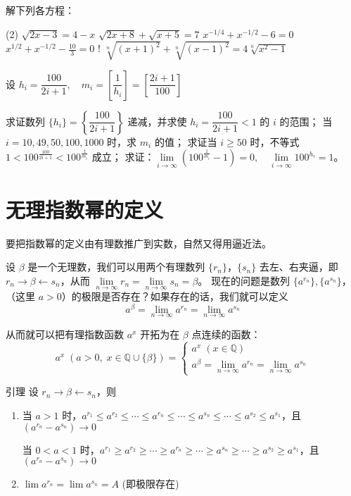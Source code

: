 \begin{Exercise}
\begin{question}
\begin{tasks}
  \end{tasks}
  \item  解下列各方程：
  \begin{tasks}(2)
    \task  $\sqrt{2 x-3}=4-x$
    \task  $\sqrt{2 x+8}+\sqrt{x+5}=7$
    \task  $x^{-1 / 4}+x^{-1 / 2}-6=0$
    \task  $x^{1 / 2}+x^{-1 / 2}-\frac{10}{3}=0$
    \task!  $\sqrt[n]{(x+1)^{2}}+\sqrt[n]{(x-1)^{2}}=4 \sqrt[n]{x^{2}-1}$
  \end{tasks}
  \item  设 $h_{i}=\dfrac{100}{2i+1},\quad  m_{i}=\left[\dfrac{1}{h_{i}}\right]=\left[\dfrac{2 i+1}{100}\right]$
  \begin{tasks}
    \task 求证数列 $\{h_i\}=\left\{\dfrac{100}{2i+1}\right\}$ 递减，并求使 $h_i=\dfrac{100}{2i+1}<1$ 的 $i$ 的范围；
    \task 当 $i=10,49,50,100,1000$ 时，求 $m_i$ 的值；
    \task 求证当 $i\geqslant 50$ 时，不等式 $1<100^{\tfrac{100}{2i+1}}<100^{\tfrac{1}{m_i}}$ 成立；
    \task 求证：$\lim\limits_{i\to\infty}\left(100^{\tfrac{1}{m_i}}-1\right)=0,\quad \lim\limits_{i\to\infty}100^{h_i}=1$。
  \end{tasks}
\end{question}
\end{Exercise}

\section{无理指数幂的定义}
要把指数幂的定义由有理数推广到实数，自然又得用逼近法。

设 $\beta$ 是一个无理数，我们可以用两个有理数列 $\{r_n\}$，$\{s_n\}$ 去左、右夹逼，即 $r_n\to \beta\leftarrow s_n$，从而 $\lim\limits_{n\to\infty}r_n=\lim\limits_{n\to\infty}s_n=\beta$。 现在的问题是数列 $\{a^{r_n}\},\{a^{s_n}\}$，（这里 $a>0$）的极限是否存在？如果存在的话，我们就可以定义
\[a^{\beta}=\lim_{n\to\infty}a^{r_n}=\lim_{n\to\infty}a^{s_n}\]

从而就可以把有理指数函数 $a^x$ 开拓为在 $\beta$ 点连续的函数：
\[a^x\; (a>0,\; x\in \mathbb{Q}\cup\{\beta\})=\begin{cases}
  a^x\;  (x\in\mathbb{Q})\\
  a^{\beta}=\lim\limits_{n\to\infty}a^{r_n}=\lim\limits_{n\to\infty}a^{s_n}
\end{cases}\]

\begin{Theorem}{引理}
设 $r_{n} \rightarrow \beta \leftarrow s_{n}$，则
\begin{enumerate}
  \item 当 $a>1$ 时，$a^{r_1}\leqslant a^{r_2}\leqslant\cdots\leqslant a^{r_n}\leqslant\cdots \leqslant a^{s_n}\leqslant\cdots\leqslant a^{s_2}\leqslant a^{s_1}$，且$\left(a^{r_n}-a^{s_n}\right)\to 0$
 
  当 $0<a<1$ 时，$a^{r_1}\geqslant a^{r_2}\geqslant \cdots\geqslant a^{r_n}\geqslant \cdots \geqslant a^{s_n}\geqslant \cdots\geqslant a^{s_2}\geqslant a^{s_1}$，且$\left(a^{r_n}-a^{s_n}\right)\to 0$

  \item $\lim a^{r_n}=\lim a^{s_{n}}=A$ (即极限存在) 
\end{enumerate}
\end{Theorem}

